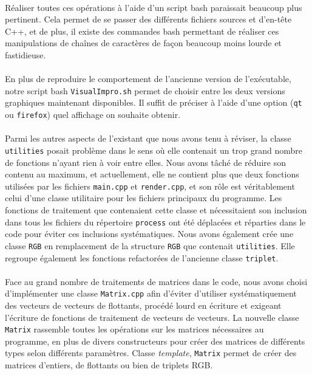 \paragraph{}
Réaliser toutes ces opérations à l'aide d'un script bash paraissait
beaucoup plus pertinent. Cela permet de se passer des différents
fichiers sources et d'en-tête C++, et de plus, il existe des commandes
bash permettant de réaliser ces manipulations de chaînes de caractères
de façon beaucoup moins lourde et fastidieuse.
\paragraph{}
En plus de reproduire le comportement de l'ancienne version de
l'exécutable, notre script bash \verb!VisualImpro.sh! permet de
choisir entre les deux versions graphiques maintenant disponibles. Il
suffit de préciser à l'aide d'une option (\verb!qt! ou \verb!firefox!)
quel affichage on souhaite obtenir.
\paragraph{}
Parmi les autres aspects de l'existant que nous avons tenu à réviser,
la classe \verb!utilities! posait problème dans le sens où elle
contenait un trop grand nombre de fonctions n'ayant rien à voir entre
elles. Nous avons tâché de réduire son contenu au maximum, et
actuellement, elle ne contient plus que deux fonctions utilisées par
les fichiers \verb!main.cpp! et \verb!render.cpp!, et son rôle est
véritablement celui d'une classe utilitaire pour les fichiers
principaux du programme. Les fonctions de traitement que contenaient
cette classe et nécessitaient son inclusion dans tous les fichiers du
répertoire \verb!process! ont été déplacées et réparties dans le code
pour éviter ces inclusions systématiques. Nous avons également crée
une classe \verb!RGB! en remplacement de la structure \verb!RGB! que
contenait \verb!utilities!. Elle regroupe également les fonctions
refactorées de l'ancienne classe \verb!triplet!.
\paragraph{}
Face au grand nombre de traitements de matrices dans le code, nous
avons choisi d'implémenter une classe \verb!Matrix.cpp! afin d'éviter
d'utiliser systématiquement des vecteurs de vecteurs de flottants,
procédé lourd en écriture et exigeant l'écriture de fonctions de
traitement de vecteurs de vecteurs. La nouvelle classe \verb!Matrix!
rassemble toutes les opérations sur les matrices nécessaires au
programme, en plus de divers constructeurs pour créer des matrices de
différents types selon différents paramètres. Classe
\textit{template}, \verb!Matrix! permet de créer des matrices
d'entiers, de flottants ou bien de triplets RGB.

